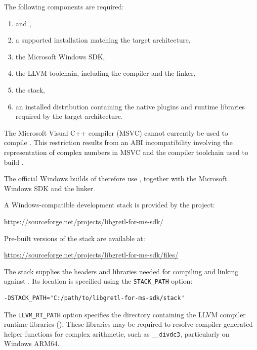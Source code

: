 The following components are required:

\begin{enumerate}
	\item {} and ,
	\item a supported \python installation matching
		the target architecture,
	\item the Microsoft Windows SDK,
	\item the LLVM toolchain, including the 
		\cpp compiler and the  linker,
	\item the  stack,
	\item an installed \gretl distribution containing
		the native plugins and runtime libraries required
		by the target architecture.
\end{enumerate}

The Microsoft Visual C++ compiler (MSVC) cannot currently
be used to compile \gretlpy. This restriction results
from an ABI incompatibility involving the representation
of complex numbers in MSVC and the compiler toolchain
used to build \lgretl.

The official Windows builds of \gretlpy therefore use
, together with the Microsoft Windows SDK
and the  linker.

A Windows-compatible \lgretl development stack is
provided by the  project:

\begin{center}
	\url{https://sourceforge.net/projects/libgretl-for-ms-sdk/}
\end{center}

Pre-built versions of the stack are available at:

\begin{center}
	\url{https://sourceforge.net/projects/libgretl-for-ms-sdk/files/}
\end{center}

The stack supplies the headers and libraries needed
for compiling and linking against \lgretl. Its location
is specified using the \texttt{STACK\_PATH} option:

\begin{verbatim}
-DSTACK_PATH="C:/path/to/libgretl-for-ms-sdk/stack"
\end{verbatim}

The \texttt{LLVM\_RT\_PATH} option specifies the directory
containing the LLVM compiler runtime libraries
(). These libraries may be required to
resolve compiler-generated helper functions for complex
arithmetic, such as \texttt{\_\_divdc3}, particularly
on Windows ARM64.

